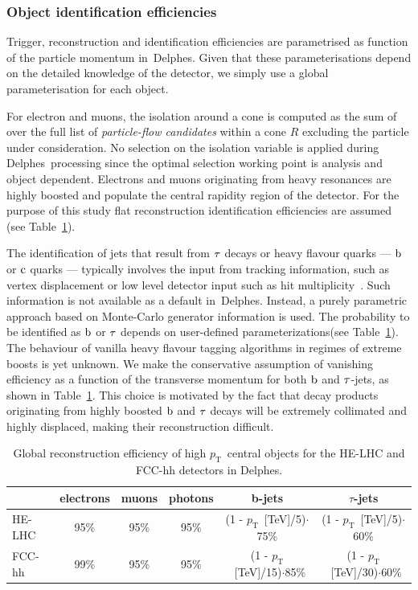 \documentclass[a4paper,11pt]{article}
\newcommand{\pt}{\ensuremath{p_{\text{T}}}}
\newcommand{\delphes}{{\sc Delphes}}
\begin{document}
\subsubsection{Object identification efficiencies}
\label{appsub:objid}

Trigger, reconstruction and identification efficiencies are parametrised as function of the particle momentum in~\delphes{}. Given that these parameterisations depend on the detailed knowledge of the detector, we simply use a global parameterisation for each object.

For electron and muons, the isolation around a cone is computed as the sum of over the full list of \emph{particle-flow candidates} within a cone $R$ excluding the particle under consideration. No selection on the isolation variable is applied during \delphes\ processing since the optimal selection working point is analysis and object dependent. Electrons and muons originating from heavy resonances are highly boosted and populate the central rapidity region of the detector. For the purpose of this study flat reconstruction identification efficiencies are assumed (see Table~\ref{tab:effs}).

The identification of jets that result from $\rm{\tau}$ decays or heavy flavour quarks --- $\rm{b}$ or $\rm{c}$ quarks --- typically involves the input from tracking information, such as vertex displacement or low level detector input such as hit multiplicity~\cite{PerezCodina:2631478,PerezCodina:2635893}. Such information is not available as a default in~\delphes{}. Instead, a purely parametric approach based on Monte-Carlo generator information is used. The probability to be identified as $\rm{b}$ or $\rm{\tau}$ depends on user-defined parameterizations(see Table~\ref{tab:effs}). The behaviour of vanilla heavy flavour tagging algorithms in regimes of extreme boosts is yet unknown. We make the conservative assumption of vanishing efficiency as a function of the transverse momentum for both $\rm{b}$ and $\rm{\tau}$-jets, as shown in Table~\ref{tab:effs}. This choice is motivated by the fact that decay products originating from highly boosted $\rm{b}$ and $\rm{\tau}$ decays will be extremely collimated and highly displaced, making their reconstruction difficult. 

\begin {table}[htb!]
\begin{center}
\begin{tabular}{ l | c | c | c | c | c }
  & electrons & muons & photons & b-jets & $\tau$-jets\\
  \hline
  \hline
HE-LHC & 95\% & 95\% & 95\% & (1 - \pt~[TeV]/5)$\cdot$75\% & (1 - \pt~[TeV]/5)$\cdot$60\%  \\
FCC-hh & 99\% & 95\% & 95\%  & (1 - \pt~[TeV]/15)$\cdot$85\% & (1 - \pt~[TeV]/30)$\cdot$60\% \\
\end{tabular}
\caption{Global reconstruction efficiency of high \pt\ central objects for the HE-LHC and FCC-hh detectors in Delphes.}
\label{tab:effs}
\end{center}
\end{table}
\end{document}
